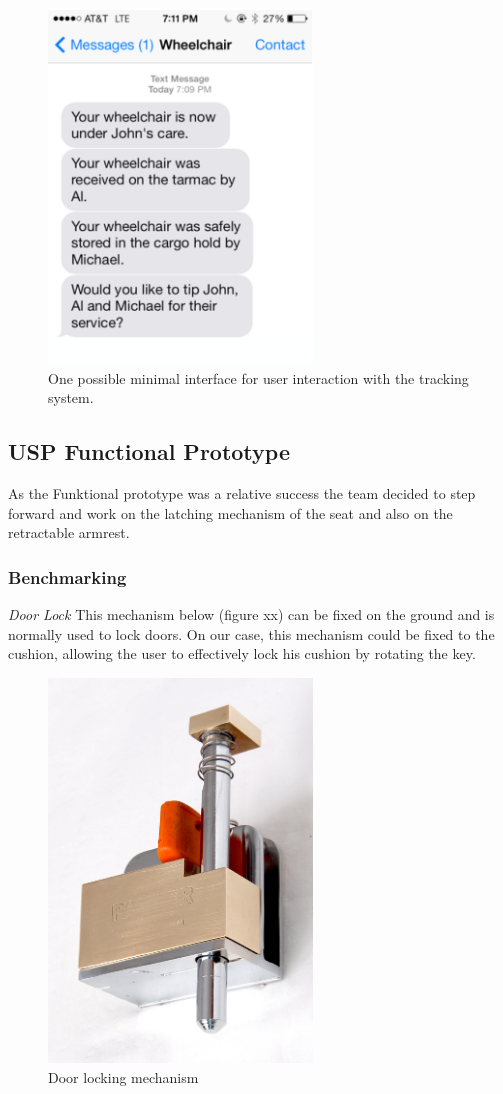 \begin{figure}[h]
  \centering
     \includegraphics[width=7cm]{images/tips.png}
   \caption{One possible minimal interface for user interaction with the tracking system.}
  \label{fig:tips}
\end{figure}

\subsection{USP Functional Prototype}

As the Funktional prototype was a relative success the team decided to step forward and work on the latching mechanism of the seat and also on the retractable armrest.

\subsubsection{Benchmarking}

\emph{Door Lock}
	This mechanism below (figure xx) can be fixed on the ground and is normally used to lock doors. On our case, this mechanism could be fixed to the cushion, allowing the user to effectively lock his cushion by rotating the key.

\begin{figure}[h]
\centering
\includegraphics[width=7cm]{brazil_images/image043.png}
\caption{Door locking mechanism}
\label{fig:door_locking}
\end{figure}


